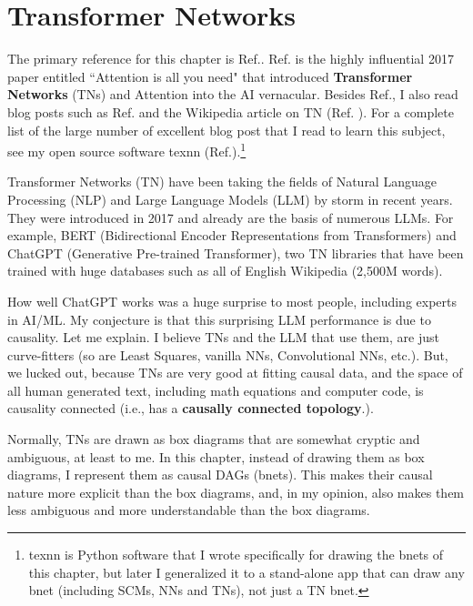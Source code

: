 \chapter{Transformer Networks}
\label{ch-transformer}

The primary reference for this chapter is  Ref.\cite{attention-is-all-you-need}.
Ref.\cite{attention-is-all-you-need} is  
 the highly influential  2017 paper entitled
``Attention is all you need" 
that introduced {\bf Transformer Networks} (TNs) and 
Attention into the AI vernacular.
Besides Ref.\cite{attention-is-all-you-need},
I also read blog posts
such as Ref.\cite{joshi-trans}
and the Wikipedia article on  TN (Ref. \cite{wiki-transformer}).
For a complete list of the large number
of excellent blog post that I read to learn
this subject, see my open source software texnn
(Ref.\cite{texnn}).\footnote{
texnn is
 Python software 
 that I wrote
specifically for drawing the bnets
of this chapter, but later I 
generalized it to a stand-alone app that can draw
any bnet (including SCMs, NNs and TNs), not just a TN bnet.}

Transformer Networks (TN)
have been taking the fields of
Natural Language Processing (NLP)
and Large Language Models (LLM)
by storm in recent years.
They were introduced in 2017 and already
are the basis of numerous LLMs.
For example,
BERT (Bidirectional Encoder
Representations from Transformers)
and ChatGPT (Generative Pre-trained Transformer),
two TN libraries that
have been trained with
huge databases such as all of
English Wikipedia (2,500M words).

How well ChatGPT works was a huge
surprise to most people, including experts in AI/ML.
My conjecture is that this surprising
LLM performance is
 due to causality.
 Let me explain. I believe TNs and the LLM that use them, are just curve-fitters (so are Least Squares, vanilla NNs, Convolutional NNs, etc.). But, we lucked out, because
TNs are very good at fitting causal data, and the space of all human generated text, including math
equations and computer code,
is causality connected (i.e., has
a {\bf causally connected topology}.).

Normally, TNs are
drawn as box diagrams
that are somewhat cryptic and ambiguous, at least to me.
In this chapter,
instead of 
drawing them as box diagrams,
I represent them as causal DAGs (bnets). This makes their
causal nature more explicit than 
the box diagrams, and,
in my opinion, also makes them
less ambiguous  and more understandable than the box diagrams.




